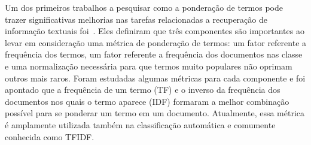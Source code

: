 Um dos primeiros trabalhos a pesquisar como a ponderação de termos pode trazer significativas melhorias nas tarefas relacionadas a recuperação de informação textuais foi~\cite{Salton88}.
Eles definiram que três componentes são importantes ao levar em consideração uma métrica de ponderação de termos: um fator referente a frequência dos termos, um fator referente a frequência dos documentos nas classe e uma normalização necessária para que termos muito populares não oprimam outros mais raros.
Foram estudadas algumas métricas para cada componente e foi apontado que a frequência de um termo (\textsc{TF}) e o inverso da frequência dos documentos nos quais o termo aparece (\textsc{IDF}) formaram a melhor combinação possível para se ponderar um termo em um documento. 
Atualmente, essa métrica é amplamente utilizada também na classificação automática e comumente conhecida como \textsc{TFIDF}.

